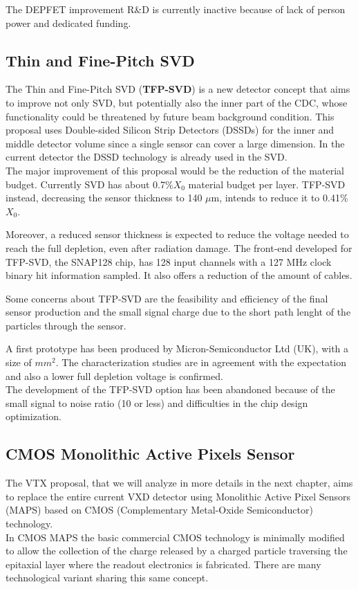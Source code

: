 The DEPFET improvement R\&D is currently inactive because of lack of person power and dedicated funding.

\subsection{Thin and Fine-Pitch SVD}

The Thin and Fine-Pitch SVD (\textbf{TFP-SVD}) is a new detector concept that aims to improve not only SVD, but potentially also the inner part of the CDC, whose functionality could be threatened by future beam background condition.
This proposal uses Double-sided Silicon Strip Detectors (DSSDs) for the inner and middle detector volume since a single sensor can cover a large dimension. In the current detector the DSSD technology is already used in the SVD. \\

The major improvement of this proposal would be the reduction of the material budget.
Currently SVD has about 0.7\%$X_{0}$ material budget per layer. TFP-SVD instead, decreasing the sensor thickness to 140 $\mu$m, intends to reduce it to 0.41\%$X_{0}$. 

Moreover, a reduced sensor thickness is expected to reduce the voltage needed to reach the full depletion, even after radiation damage. 
The front-end developed for TFP-SVD, the SNAP128 chip, has 128 input channels with a 127 MHz clock binary hit information sampled. It also offers a reduction of the amount of cables.

Some concerns about TFP-SVD are the feasibility and efficiency of the final sensor production and the small signal charge due to the short path lenght of the particles through the sensor.

A first prototype has been produced by Micron-Semiconductor Ltd (UK), with a size of  $mm^{2}$. The characterization studies are in agreement with the expectation and also a lower full depletion voltage is confirmed. \\
The development of the TFP-SVD option has been abandoned because of the small signal to noise ratio (10 or less) and difficulties in the chip design optimization.


\subsection{CMOS Monolithic Active Pixels Sensor}

The VTX proposal, that we will analyze in more details in the next chapter, aims to replace the entire current VXD detector using Monolithic Active Pixel Sensors (MAPS) based on CMOS (Complementary Metal-Oxide Semiconductor) technology. \\
In CMOS MAPS the basic commercial CMOS technology is minimally modified to allow the collection of the charge released by a charged particle traversing the epitaxial layer where the readout electronics is fabricated. There are many technological variant sharing this same concept.


